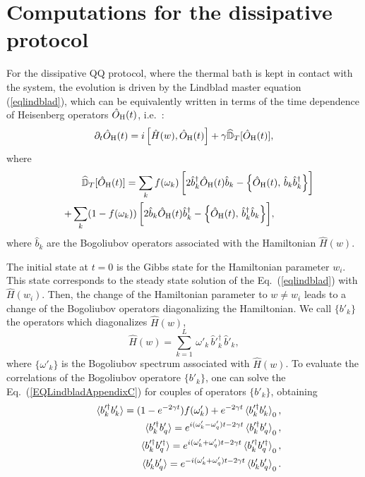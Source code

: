 \section{Computations for the dissipative protocol}
\label{dissprotcomp}

For the dissipative QQ protocol, where the thermal bath is kept in
contact with the system, the evolution is driven by the Lindblad
master equation (\ref{eqlindblad}), which can be equivalently written in
terms of the time dependence of Heisenberg operators $\hat{O}_{\rm H}(t)$,
i.e.~\cite{CPR-2022-otto_engine, dr2021self}:
\begin{eqnarray}
   \label{EQLindbladAppendixC}
   \partial_t \hat{O}_{\rm H}(t)   = i\,\Bigr[\hat{H}(w),
     \hat{O}_{\rm H}(t) \Bigr] + \gamma
   \widehat{\mathbb{D}}_T[\hat{O}_{\rm H}(t)],
\end{eqnarray}
   where 
\begin{eqnarray}
&& \widehat{\mathbb{D}}_T[\hat{O}_{\rm H}(t)] = \sum _k f(\omega_k)\,\biggr[2\hat
    b_{k}^\dagger \hat{O}_{\rm H}(t) \hat b_{k}- \Bigl\{ \hat{O}_{\rm
      H}(t), \, \hat b_{k} \hat b_{k}^\dagger \Bigl\} \biggr]
  \nonumber \\ && + \sum_k (1-f(\omega_k)) \,\biggr[ 2\hat b_{k}
    \hat{O}_{\rm H}(t) \hat b_{k}^\dagger - \Bigl\{ \hat{O}_{\rm
      H}(t), \, \hat b_{k}^\dagger \hat b_{k} \Bigl\}
    \biggr],\qquad\qquad
\label{dohdef}
\end{eqnarray}
where $\hat b_k$ are the Bogoliubov operators associated with the
Hamiltonian $\hat{H}(w)$.

The initial state at $t=0$ is the Gibbs state for the Hamiltonian
parameter $w_i$. This state corresponds to the steady state solution
of the Eq.~(\ref{eqlindblad}) with $\hat{H}(w_i)$. Then, the change of
the Hamiltonian parameter to $w\neq w_i$ leads to a change of the
Bogoliubov operators diagonalizing the Hamiltonian.  We call
$\{b'_k\}$ the operators which diagonalizes $\hat{H}(w)$,
\begin{equation}
  \label{quenchHdiag}
  \hat{H}(w)=\sum _{k=1}^L\,\omega'_k \,\hat b'^\dagger _k\,
  \hat b'_k,
\end{equation}
where $\{\omega'_k\}$ is the Bogoliubov spectrum associated with
$\hat{H}(w)$.
To evaluate the correlations of the Bogoliubov operatore $\{b'_k\}$,
one can solve the Eq.~(\ref{EQLindbladAppendixC}) for couples of operators
$\{b'_k\}$, obtaining~\cite{dr2021self}
\begin{eqnarray}
  && \braket{b'^\dagger_k b'_k} = ( 1 - e^{-2 \gamma t})
  f(\omega'_k) +
  e^{-2\gamma t} \braket{b'^\dagger_k b'_k}_0 ,\nonumber \\
 && \braket{b'^\dagger_k b'_q} =
e^{i(\omega'_k - \omega'_q)t-2 \gamma t}
  \braket{b'^\dagger_k b'_q}_0,
  \nonumber\\
&&  \braket{b'^\dagger_k b'^\dagger_q} =
e^{i(\omega'_k + \omega'_q)t-2 \gamma t}
  \braket{b'^\dagger_k b'^\dagger_q}_0,
  \nonumber \\
  &&  \braket{b'_k b'_q} =
  e^{-i(\omega'_k + \omega'_q)t-2 \gamma t}
  \braket{b'_k b'_q}_0.
  \label{EQLindbladprime}
\end{eqnarray}

